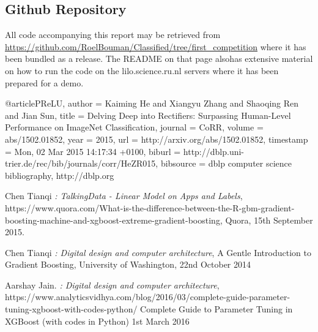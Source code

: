 \documentclass[runningheads,a4paper]{llncs}
\begin{document}
\subsection{Github Repository}
All code accompanying this report may be retrieved from \url{https://github.com/RoelBouman/Classified/tree/first_competition} where it has been bundled as a release. The README on that page alsohas extensive material on how to run the code on the lilo.science.ru.nl servers where it has been prepared for a demo. 
\medskip


{}

\begin{thebibliography}{9}

@article{PReLU,
  author    = {Kaiming He and
               Xiangyu Zhang and
               Shaoqing Ren and
               Jian Sun},
  title     = {Delving Deep into Rectifiers: Surpassing Human-Level Performance on
               ImageNet Classification},
  journal   = {CoRR},
  volume    = {abs/1502.01852},
  year      = {2015},
  url       = {http://arxiv.org/abs/1502.01852},
  timestamp = {Mon, 02 Mar 2015 14:17:34 +0100},
  biburl    = {http://dblp.uni-trier.de/rec/bib/journals/corr/HeZR015},
  bibsource = {dblp computer science bibliography, http://dblp.org}
}


Chen Tianqi
\emph{: TalkingData - Linear Model on Apps and Labels},
https://www.quora.com/What-is-the-difference-between-the-R-gbm-gradient-boosting-machine-and-xgboost-extreme-gradient-boosting,
Quora,
15th September 2015.
  
Chen Tianqi
\emph{: Digital design and computer architecture},  
A Gentle Introduction to Gradient Boosting,
University of Washington,
22nd October 2014

Aarshay Jain. 
\emph{: Digital design and computer architecture},  
https://www.analyticsvidhya.com/blog/2016/03/complete-guide-parameter-tuning-xgboost-with-codes-python/
Complete Guide to Parameter Tuning in XGBoost (with codes in Python)
1st March 2016

\end{thebibliography}
\end{document}
